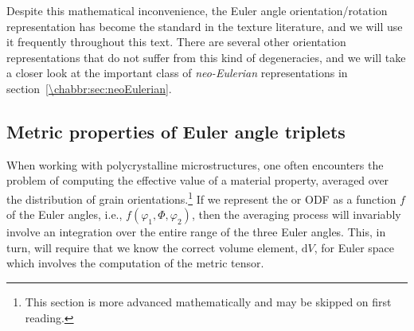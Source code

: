 Despite this mathematical inconvenience, the Euler angle orientation/rotation representation has become the standard in the texture literature, and we will use it frequently throughout this text.  There are several other orientation representations that do not suffer from this kind of degeneracies, and we will take a closer look at the important class of \textit{neo-Eulerian} representations in section~\ref{\chabbr:sec:neoEulerian}.


\subsection{Metric properties of Euler angle triplets}\label{\chabbr:sec:eulermetric}
When working with polycrystalline microstructures, one often encounters the problem of computing the effective value of a material property, averaged over the distribution of grain orientations.\footnote{This section is more advanced mathematically and may be skipped on first reading.}  If we represent the  or ODF as a function $f$ of the Euler angles, i.e., $f(\varphi_1,\Phi,\varphi_2)$, then the averaging process will invariably involve an integration over the entire range of the three Euler angles. This, in turn, will require that we know the correct volume element, $\mathrm{d}V$, for Euler space which involves the computation of the metric tensor.  

